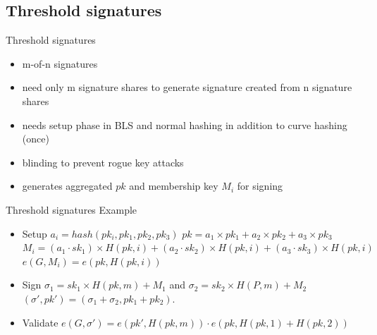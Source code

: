 \documentclass{beamer}
\begin{document}
\subsection{Threshold signatures}
\begin{frame}{Threshold signatures}
	\begin{itemize}
		\item m-of-n signatures
		\item need only m signature shares to generate signature created from n signature shares
		\item needs setup phase in BLS and normal hashing in addition to curve hashing (once)
		\item blinding to prevent rogue key attacks
		\item generates aggregated $pk$ and membership key $M_i$ for signing
	\end{itemize}
\end{frame}
\begin{frame}{Threshold signatures}
	Example
	\begin{itemize}
		\item Setup \newline
		$a_i = hash(pk_i,{pk_1,pk_2,pk_3})$ \newline
		$pk = a_1\times{pk_1}+a_2\times{pk_2}+a_3\times{pk_3}$ \newline
		$M_i = (a_1 \cdot sk_1) \times{H(pk,i)} + (a_2 \cdot sk_2) \times{H(pk,i)} + (a_3 \cdot sk_3) \times{H(pk,i)}$ \newline
		$e(G,M_i) = e(pk,H(pk,i))$
		\item Sign \newline
		$\sigma_1 = sk_1 \times{H(pk,m)} + M_1$ and $\sigma_2 = sk_2 \times{H(P,m)} + M_2$
		$(\sigma',pk') = (\sigma_1 + \sigma_2, pk_1 + pk_2)$.
		\item Validate \newline
		$e(G,\sigma') = e(pk',H(pk,m)) \cdot e(pk, H(pk,1)+H(pk,2))$
	\end{itemize}
\end{frame}
\end{document}
